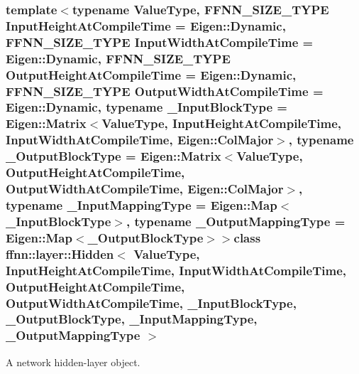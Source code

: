\subsubsection*{template$<$typename Value\-Type, F\-F\-N\-N\-\_\-\-S\-I\-Z\-E\-\_\-\-T\-Y\-P\-E Input\-Height\-At\-Compile\-Time = Eigen\-::\-Dynamic, F\-F\-N\-N\-\_\-\-S\-I\-Z\-E\-\_\-\-T\-Y\-P\-E Input\-Width\-At\-Compile\-Time = Eigen\-::\-Dynamic, F\-F\-N\-N\-\_\-\-S\-I\-Z\-E\-\_\-\-T\-Y\-P\-E Output\-Height\-At\-Compile\-Time = Eigen\-::\-Dynamic, F\-F\-N\-N\-\_\-\-S\-I\-Z\-E\-\_\-\-T\-Y\-P\-E Output\-Width\-At\-Compile\-Time = Eigen\-::\-Dynamic, typename \-\_\-\-Input\-Block\-Type = Eigen\-::\-Matrix$<$\-Value\-Type, Input\-Height\-At\-Compile\-Time, Input\-Width\-At\-Compile\-Time, Eigen\-::\-Col\-Major$>$, typename \-\_\-\-Output\-Block\-Type = Eigen\-::\-Matrix$<$\-Value\-Type, Output\-Height\-At\-Compile\-Time, Output\-Width\-At\-Compile\-Time, Eigen\-::\-Col\-Major$>$, typename \-\_\-\-Input\-Mapping\-Type = Eigen\-::\-Map$<$\-\_\-\-Input\-Block\-Type$>$, typename \-\_\-\-Output\-Mapping\-Type = Eigen\-::\-Map$<$\-\_\-\-Output\-Block\-Type$>$$>$class ffnn\-::layer\-::\-Hidden$<$ Value\-Type, Input\-Height\-At\-Compile\-Time, Input\-Width\-At\-Compile\-Time, Output\-Height\-At\-Compile\-Time, Output\-Width\-At\-Compile\-Time, \-\_\-\-Input\-Block\-Type, \-\_\-\-Output\-Block\-Type, \-\_\-\-Input\-Mapping\-Type, \-\_\-\-Output\-Mapping\-Type $>$}

A network hidden-\/layer object. 

